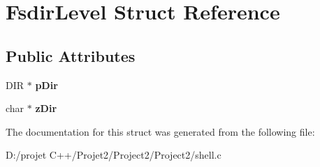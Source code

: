 \hypertarget{struct_fsdir_level}{}\section{Fsdir\+Level Struct Reference}
\label{struct_fsdir_level}
\subsection*{Public Attributes}
\begin{DoxyCompactItemize}
\item 
\mbox{\label{struct_fsdir_level_a16f692d04df7ef4e772f16e27ac1513b}} 
D\+IR $\ast$ {\bfseries p\+Dir}
\item 
\mbox{\label{struct_fsdir_level_aa10c09bc56dedc0259952ef1df766611}} 
char $\ast$ {\bfseries z\+Dir}
\end{DoxyCompactItemize}


The documentation for this struct was generated from the following file\+:\begin{DoxyCompactItemize}
\item 
D\+:/projet C++/\+Projet2/\+Project2/\+Project2/shell.\+c\end{DoxyCompactItemize}
